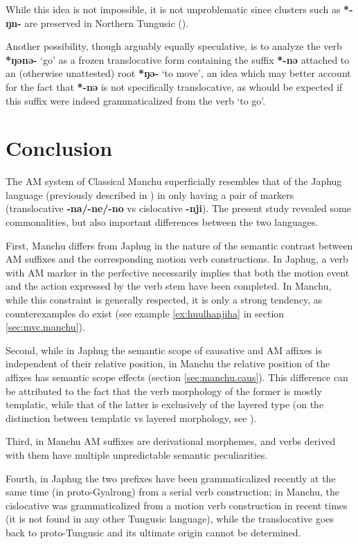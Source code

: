 \documentclass{article}
\newcommand{\ipa}[1]{\textbf{{\phon\mbox{#1}}}} %
\begin{document}
While this idea is not impossible, it is not unproblematic since clusters such as \ipa{*-ŋn-} are preserved in Northern Tungusic (\citealt[241-4]{cincius49fonetika}). 

Another possibility, though arguably equally speculative, is to analyze the verb \ipa{*ŋənə-} `go' as a frozen translocative form containing the suffix \ipa{*-nə} attached to an (otherwise unattested) root \ipa{*ŋə-} `to move', an idea which may better account for the fact that \ipa{*-nə} is not specifically translocative, as whould be expected if this suffix were indeed grammaticalized from the verb `to go'. 

\section*{Conclusion}
The AM system of Classical Manchu superficially resembles that of the Japhug language (previously described in \citealt{jacques13harmonization}) in only having a pair of markers (translocative \ipa{-na/-ne/-no} vs cislocative \ipa{-nji}). The present study revealed some commonalities, but also important differences between the two languages. 

First, Manchu differs from Japhug in the nature of the semantic contrast between AM suffixes and the corresponding motion verb constructions. In Japhug, a verb with AM marker in the perfective necessarily implies that both the motion event and the action expressed by the verb stem have been completed. In Manchu, while this constraint is generally respected, it is only a strong tendency, as counterexamples do exist (see example \ref{ex:huulhanjiha} in section \ref{sec:mvc.manchu}).

Second, while in Japhug the semantic scope of causative and AM affixes is independent of their relative position, in Manchu the relative position of the affixes has semantic scope effects (section \ref{sec:manchu.caus}). This difference can be attributed to the fact that the verb morphology of the former is mostly templatic, while that of the latter is exclusively of the layered type (on the distinction between templatic vs layered morphology, see \citealt{bickel07inflectional}).

Third, in Manchu AM suffixes are derivational morphemes, and   verbs derived with them have multiple unpredictable semantic peculiarities.

Fourth, in Japhug the two prefixes have been grammaticalized recently at the same time (in proto-Gyalrong) from a serial verb construction; in Manchu, the cislocative was grammaticalized from a motion verb construction in recent times (it is not found in any other Tungusic language), while the translocative goes back to proto-Tungusic and its ultimate origin cannot be determined.
\end{document}
